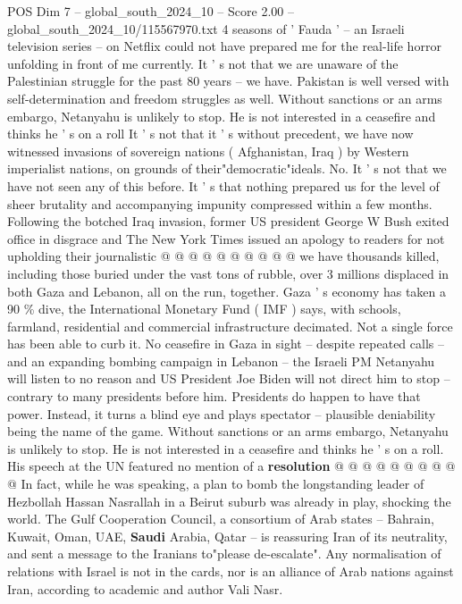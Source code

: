 \begin{textsample}{POS Dim 7 – global\_south\_2024\_10 – Score 2.00 – global\_south\_2024\_10/115567970.txt}  \label{ex:f7_pos_205}
4 seasons of ' Fauda ' -- an Israeli television series -- on Netflix could not have prepared me for the real-life horror unfolding in front of me currently.
It ' s not that we are unaware of the Palestinian struggle for the past 80 years -- we have.
Pakistan is well versed with self-determination and freedom struggles as well.
Without sanctions or an arms embargo, Netanyahu is unlikely to stop.
He is not interested in a ceasefire and thinks he ' s on a roll It ' s not that it ' s without precedent, we have now witnessed invasions of sovereign nations ( Afghanistan, Iraq ) by Western imperialist nations, on grounds of their"democratic"ideals.
No.
It ' s not that we have not seen any of this before.
It ' s that nothing prepared us for the level of sheer brutality and accompanying impunity compressed within a few months.
Following the botched Iraq invasion, former US president George W Bush exited office in disgrace and The New York Times issued an apology to readers for not upholding their journalistic @ @ @ @ @ @ @ @ @ @ we have thousands killed, including those buried under the vast tons of rubble, over 3 millions displaced in both Gaza and Lebanon, all on the run, together.
Gaza ' s economy has taken a 90 \% dive, the International Monetary Fund ( IMF ) says, with schools, farmland, residential and commercial infrastructure decimated.
Not a single force has been able to curb it.
No ceasefire in Gaza in sight -- despite repeated calls -- and an expanding bombing campaign in Lebanon -- the Israeli PM Netanyahu will listen to no reason and US President Joe Biden will not direct him to stop -- contrary to many presidents before him.
Presidents do happen to have that power.
Instead, it turns a blind eye and plays spectator -- plausible deniability being the name of the game.
Without sanctions or an arms embargo, Netanyahu is unlikely to stop.
He is not interested in a ceasefire and thinks he ' s on a roll.
His speech at the UN featured no mention of a \textbf{resolution} @ @ @ @ @ @ @ @ @ @ In fact, while he was speaking, a plan to bomb the longstanding leader of Hezbollah Hassan Nasrallah in a Beirut suburb was already in play, shocking the world.
The Gulf Cooperation Council, a consortium of Arab states -- Bahrain, Kuwait, Oman, UAE, \textbf{Saudi} Arabia, Qatar -- is reassuring Iran of its neutrality, and sent a message to the Iranians to"please de-escalate".
Any normalisation of relations with Israel is not in the cards, nor is an alliance of Arab nations against Iran, according to academic and author Vali Nasr.

\end{textsample}
